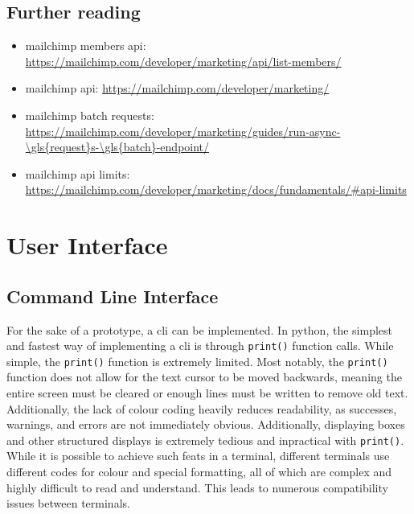 \documentclass[11pt]{article}
\begin{document}
\subsection{Further reading}

\begin{itemize}
    \item \Gls{mailchimp} members \acrshort{api}: \url{https://mailchimp.com/developer/marketing/api/list-members/}
    \item \Gls{mailchimp} \acrshort{api}: \url{https://mailchimp.com/developer/marketing/}
    \item \Gls{mailchimp} \gls{batch} \gls{request}s: \url{https://mailchimp.com/developer/marketing/guides/run-async-\gls{request}s-\gls{batch}-endpoint/}
    \item \Gls{mailchimp} \acrshort{api} limits: \url{https://mailchimp.com/developer/marketing/docs/fundamentals/#api-limits}
\end{itemize}

\newpage

\section{User Interface}

\subsection{Command Line Interface}

For the sake of a prototype, a \acrfull{cli} can be implemented. In \Gls{python}, the simplest and fastest way of implementing a \acrshort{cli} is through \texttt{print()} function calls. While simple, the \texttt{print()} function is extremely limited. Most notably, the \texttt{print()} function does not allow for the text cursor to be moved backwards, meaning the entire screen must be cleared or enough lines must be written to remove old text. Additionally, the lack of colour coding heavily reduces readability, as successes, warnings, and errors are not immediately obvious. Additionally, displaying boxes and other structured displays is extremely tedious and inpractical with \texttt{print()}. While it is possible to achieve such feats in a terminal, different terminals use different codes for colour and special formatting, all of which are complex and highly difficult to read and understand. This leads to numerous compatibility issues between terminals.
\end{document}
